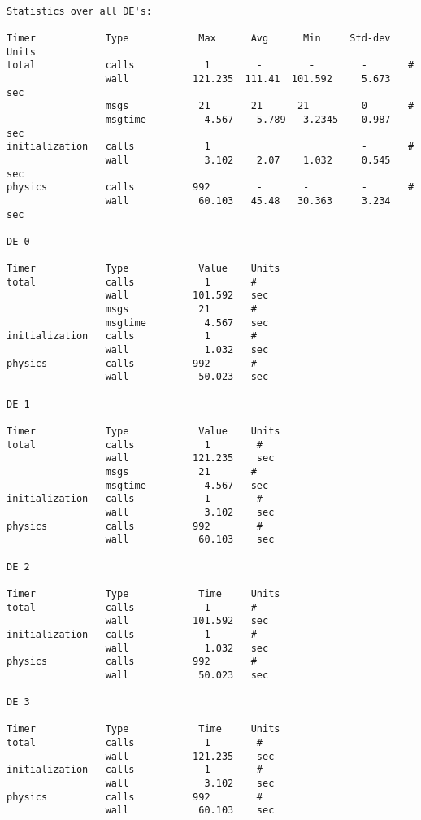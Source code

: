 {\tt
\begin{verbatim}
Statistics over all DE's:

Timer            Type            Max      Avg      Min     Std-dev  Units
total            calls            1        -        -        -       #
                 wall           121.235  111.41  101.592     5.673   sec
                 msgs            21       21      21         0       #
                 msgtime          4.567    5.789   3.2345    0.987   sec
initialization   calls            1                          -       #
                 wall             3.102    2.07    1.032     0.545   sec
physics          calls          992        -       -         -       #
                 wall            60.103   45.48   30.363     3.234   sec

DE 0

Timer            Type            Value    Units
total            calls            1       #
                 wall           101.592   sec
                 msgs            21       #
                 msgtime          4.567   sec
initialization   calls            1       #
                 wall             1.032   sec
physics          calls          992       #
                 wall            50.023   sec

DE 1

Timer            Type            Value    Units
total            calls            1        #
                 wall           121.235    sec
                 msgs            21       #
                 msgtime          4.567   sec
initialization   calls            1        #
                 wall             3.102    sec
physics          calls          992        #
                 wall            60.103    sec

DE 2

Timer            Type            Time     Units
total            calls            1       #
                 wall           101.592   sec
initialization   calls            1       #
                 wall             1.032   sec
physics          calls          992       #
                 wall            50.023   sec

DE 3

Timer            Type            Time     Units
total            calls            1        #
                 wall           121.235    sec
initialization   calls            1        #
                 wall             3.102    sec
physics          calls          992        #
                 wall            60.103    sec

\end{verbatim}
}
